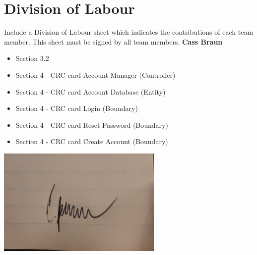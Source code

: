 \documentclass[]{article}
\begin{document}
\FloatBarrier

\appendix
\section{Division of Labour}
\label{sec:division_of_labour}
Include a Division of Labour sheet which indicates the contributions of each team member. This sheet must be signed by all team members.
\newline
\newline
\textbf{Cass Braun}
\begin{itemize}
    \setlength\itemindent{2em}
    \item Section 3.2
    \item Section 4 - CRC card Account Manager (Controller) 
    \item Section 4 - CRC card Account Database (Entity)
    \item Section 4 - CRC card Login (Boundary)
    \item Section 4 - CRC card Reset Password (Boundary) 
    \item Section 4 - CRC card Create Account (Boundary) \end{itemize} 
\includegraphics[width=0.6\textwidth]{Cass.jpg}
\end{document}
